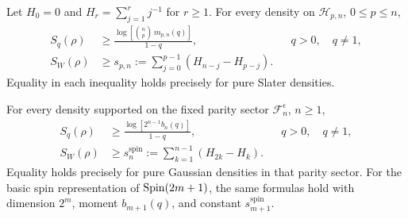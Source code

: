 \begin{theorem}
\label{ent:minima}
Let $H_0=0$ and $H_r=\sum_{j=1}^r j^{-1}$ for $r\ge1$.
For every density on $\mathcal H_{p,n}$, $0\le p\le n$,
\begin{align}
 S_q(\rho)
 &\ge\frac{\log\!\left[\binom np\,m_{p,n}(q)\right]}{1-q},
 &&q>0,\quad q\ne1,
 \label{ent:exterior-renyi}\\
 S_W(\rho)
 &\ge s_{p,n}:=\sum_{j=0}^{p-1}(H_{n-j}-H_{p-j}).
 \label{ent:exterior-wehrl}
\end{align}
Equality in each inequality holds precisely for pure Slater densities.

For every density supported on the fixed parity sector
$\mathcal F_n^\epsilon$, $n\ge1$,
\begin{align}
 S_q(\rho)
 &\ge\frac{\log[2^{n-1}b_n(q)]}{1-q},
 &&q>0,\quad q\ne1,
 \label{ent:spin-renyi}\\
 S_W(\rho)
 &\ge s_n^{\mathrm{spin}}:=\sum_{k=1}^{n-1}(H_{2k}-H_k).
 \label{ent:spin-wehrl}
\end{align}
Equality holds precisely for pure Gaussian densities in that parity
sector. For the basic spin representation of $\operatorname{Spin}(2m+1)$, the
same formulas hold with dimension $2^m$, moment $b_{m+1}(q)$,
and constant $s_{m+1}^{\mathrm{spin}}$.
\end{theorem}
